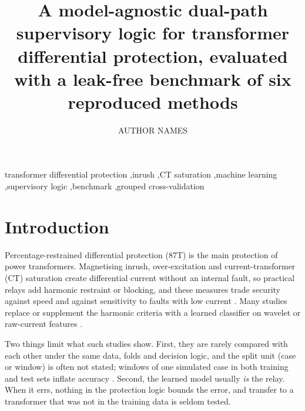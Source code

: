 \documentclass[preprint,12pt]{elsarticle}
\begin{document}
\begin{frontmatter}
\title{A model-agnostic dual-path supervisory logic for transformer differential protection, evaluated with a leak-free benchmark of six reproduced methods}
\author[inst1]{AUTHOR NAMES}
\begin{abstract}

\end{abstract}
\begin{keyword}
transformer differential protection \sep inrush \sep CT saturation \sep machine learning \sep supervisory logic \sep benchmark \sep grouped cross-validation
\end{keyword}
\end{frontmatter}

\section{Introduction}
\label{sec:intro}
Percentage-restrained differential protection (87T) is the main protection of power transformers. Magnetising inrush, over-excitation and current-transformer (CT) saturation create differential current without an internal fault, so practical relays add harmonic restraint or blocking, and these measures trade security against speed and against sensitivity to faults with low current \citep{ieeec3791}. Many studies replace or supplement the harmonic criteria with a learned classifier on wavelet or raw-current features \citep{tripathy2010,afrasiabi2020,simoes2021,abdusalam2022,murugan2022,afsharisefat2023,alhamd2024,key2025}.

Two things limit what such studies show. First, they are rarely compared with each other under the same data, folds and decision logic, and the split unit (case or window) is often not stated; windows of one simulated case in both training and test sets inflate accuracy \citep{kapoor2023,matania2024}. Second, the learned model usually \emph{is} the relay. When it errs, nothing in the protection logic bounds the error, and transfer to a transformer that was not in the training data is seldom tested.
\end{document}
